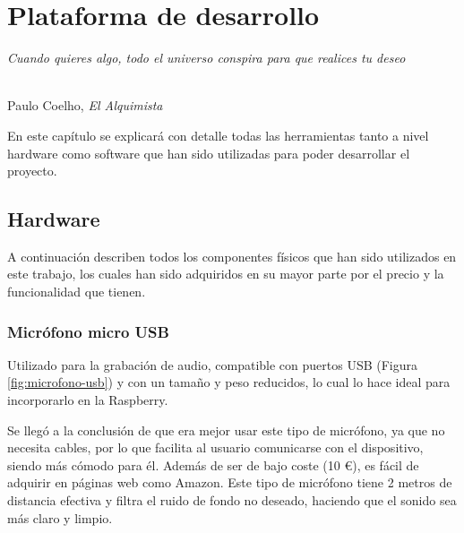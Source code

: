 \chapter{Plataforma de desarrollo}
\label{cap:capitulo4}


\begin{flushright}
\begin{minipage}[]{10cm}
\emph{Cuando quieres algo, todo el universo conspira para que realices tu deseo}\\
\end{minipage}\\

Paulo Coelho, \textit{El Alquimista}\\
\end{flushright}

\vspace{1cm}

En este capítulo se explicará con detalle todas las herramientas tanto a nivel hardware como software que han sido utilizadas para poder desarrollar el proyecto.


\section{Hardware}
\label{sec:hardware}

A continuación describen todos los componentes físicos que han sido utilizados en este trabajo, los cuales han sido adquiridos en su mayor parte por el precio y la funcionalidad que tienen.\\ 


\subsection{Micrófono micro USB}
\label{subsec:micro}

Utilizado para la grabación de audio, compatible con puertos USB (Figura \ref{fig:microfono-usb}) y con un tamaño y peso reducidos, lo cual lo hace ideal para incorporarlo en la Raspberry. 


Se llegó a la conclusión de que era mejor usar este tipo de micrófono, ya que no necesita cables, por lo que facilita al usuario comunicarse con el dispositivo, siendo más cómodo para él. Además de ser de bajo coste (10 \euro), es fácil de adquirir en páginas web como Amazon. Este tipo de micrófono tiene 2 metros de distancia efectiva y filtra el ruido de fondo no deseado, haciendo que el sonido sea más claro y limpio.


